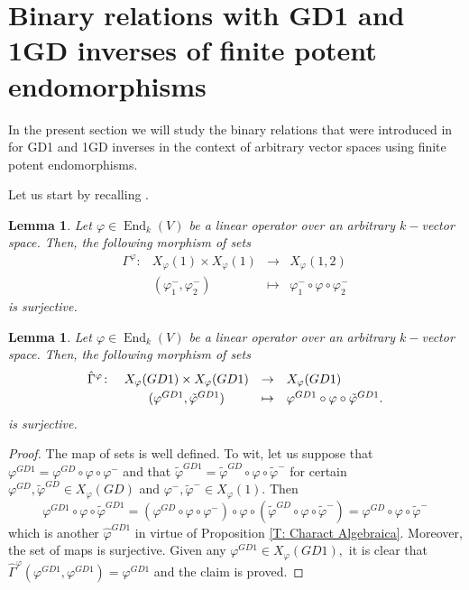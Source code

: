 \documentclass[10pt,a4paper]{amsart}
\newtheorem{lem}[defn]{Lemma}
\theoremstyle{plain}
\theoremstyle{remark}
\numberwithin{equation}{section} \numberwithin{defn}{section}
\newcommand\ed{\operatorname{End}}
\newcommand{\f}{\varphi}
\begin{document}
\section{Binary relations with GD1 and 1GD inverses of finite potent endomorphisms}\label{S: Bin Rel}

In the present section we will study the binary relations that were introduced in \cite[Section 2.1, Section 3.1]{GD1N} for GD1 and 1GD inverses in the context of arbitrary vector spaces using finite potent endomorphisms. 

Let us start by recalling \cite[Lemma 3.1]{MinusDaa}. 
 
\begin{lem}\label{L: Gamma Reflex}
Let $\f\in \ed_k(V)$ be a linear operator over an arbitrary $k-$vector space. Then, the following morphism of sets $$\begin{array}{rccl}
\Gamma^{\f} \colon & X_{\f}(1)\times X_{\f}(1) & \rightarrow & X_{\f}(1,2) \\
& (\f_1^-,\f_2^-) & \mapsto & \f_1^-\circ \f \circ \f_2^-
\end{array}$$ is surjective.
\end{lem}


\begin{lem}\label{L: GD1GD1 en GD1}
Let $\f \in \ed_k(V)$ be a linear operator over an arbitrary $k-$vector space. Then, the following morphism of sets  $$\begin{array}{rccl}
\hat{\Gamma}^{\f} \colon & X_{\f}(GD1)\times X_{\f}(GD1)  & \rightarrow & X_{\f}(GD1) \smallskip\\
& (\f^{GD1},\tilde{\f}^{GD1}) & \mapsto & \f^{GD1}\circ \f \circ \tilde{\f}^{GD1}.
\end{array} $$
is surjective.
\end{lem}
\begin{proof}
The map of sets is well defined. To wit, let us suppose that $\f^{GD1}=\f^{GD}\circ \f \circ \f^-$ and that $\tilde{\f}^{GD1}=\tilde{\f}^{GD}\circ \f \circ \tilde{\f}^{-}$ for certain $\f^{GD},\tilde{\f}^{GD}\in X_{\f}(GD)$ and $\f^-,\tilde{\f}^-\in X_{\f}(1).$ Then $$\f^{GD1}\circ \f \circ \tilde{\f}^{GD1}=(\f^{GD}\circ \f \circ \f^-)\circ \f \circ (\tilde{\f}^{GD}\circ \f \circ \tilde{\f}^{-})=\f^{GD}\circ \f \circ \tilde{\f}^- $$ which is another $\widehat{\f}^{GD1}$ in virtue of Proposition \ref{T: Charact Algebraica}. Moreover, the set of maps is surjective. Given any $\f^{GD1}\in X_{\f}(GD1),$ it is clear that $\hat{\Gamma}^{\f}(\f^{GD1},\f^{GD1})=\f^{GD1}$ and the claim is proved.
\end{proof}
\end{document}
